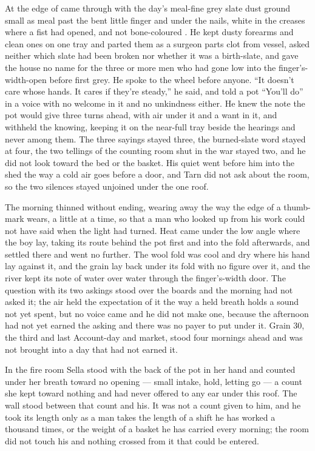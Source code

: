 At the edge of   came through with the day's meal-fine grey slate dust ground small as meal past the bent little finger and under the nails, white in the creases where a fist had opened, and not bone-coloured . He kept dusty forearms and clean ones on one tray and parted them as a surgeon parts clot from vessel, asked neither which slate had been broken nor whether it was a birth-slate, and gave the house no name for the three or more men who had gone low into the finger's-width-open  before first grey. He spoke to the wheel before anyone. “It doesn't care whose hands. It cares if they're steady,” he said, and told a pot “You'll do” in a voice with no welcome in it and no unkindness either. He knew the note the pot would give three turns ahead, with air under it and a want in it, and withheld the knowing, keeping it on the near-full tray beside the hearings and never among them. The three sayings stayed three, the burned-slate word stayed at four, the two tellings of the counting room shut in the war stayed two, and he did not look toward the bed or the basket. His quiet went before him into the shed the way a cold air goes before a door, and Tarn did not ask about the room, so the two silences stayed unjoined under the one roof.

\scenebreak

The morning thinned without ending, wearing away the way the edge of a thumb-mark wears, a little at a time, so that a man who looked up from his work could not have said when the light had turned. Heat came under the low angle where the boy lay, taking its route behind the pot first and into the fold afterwards, and settled there and went no further. The wool fold was cool and dry where his hand lay against it, and the grain lay back under its fold with no figure over it, and the river kept its note of water over water through the finger's-width door. The question with its two askings stood over the boards and the morning had not asked it; the air held the expectation of it the way a held breath holds a sound not yet spent, but no voice came and he did not make one, because the afternoon had not yet earned the asking and there was no payer to put under it. Grain 30, the third and last Account-day and market, stood four mornings ahead and was not brought into a day that had not earned it.

In the fire room Sella stood with the back of the pot in her hand and counted under her breath toward no opening --- small intake, hold, letting go --- a count she kept toward nothing and had never offered to any ear under this roof. The wall stood between that count and his. It was not a count given to him, and he took its length only as a man takes the length of a shift he has worked a thousand times, or the weight of a basket he has carried every morning; the room did not touch his and nothing crossed from it that could be entered.

